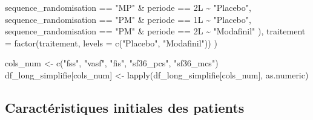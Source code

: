 \documentclass[
  letterpaper,
  DIV=11,
  numbers=noendperiod]{scrartcl}
\newenvironment{Shaded}{\begin{snugshade}}{\end{snugshade}}
\newcommand{\AttributeTok}[1]{\textcolor[rgb]{0.40,0.45,0.13}{#1}}
\newcommand{\DecValTok}[1]{\textcolor[rgb]{0.68,0.00,0.00}{#1}}
\newcommand{\FunctionTok}[1]{\textcolor[rgb]{0.28,0.35,0.67}{#1}}
\newcommand{\NormalTok}[1]{\textcolor[rgb]{0.00,0.23,0.31}{#1}}
\newcommand{\OtherTok}[1]{\textcolor[rgb]{0.00,0.23,0.31}{#1}}
\newcommand{\SpecialCharTok}[1]{\textcolor[rgb]{0.37,0.37,0.37}{#1}}
\newcommand{\StringTok}[1]{\textcolor[rgb]{0.13,0.47,0.30}{#1}}
\begin{document}
\begin{Shaded}
\begin{Highlighting}[]
\NormalTok{            sequence\_randomisation }\SpecialCharTok{==} \StringTok{"MP"} \SpecialCharTok{\&}\NormalTok{ periode }\SpecialCharTok{==} \DecValTok{2}\NormalTok{L }\SpecialCharTok{\textasciitilde{}} \StringTok{"Placebo"}\NormalTok{,}
\NormalTok{            sequence\_randomisation }\SpecialCharTok{==} \StringTok{"PM"} \SpecialCharTok{\&}\NormalTok{ periode }\SpecialCharTok{==} \DecValTok{1}\NormalTok{L }\SpecialCharTok{\textasciitilde{}} \StringTok{"Placebo"}\NormalTok{,}
\NormalTok{            sequence\_randomisation }\SpecialCharTok{==} \StringTok{"PM"} \SpecialCharTok{\&}\NormalTok{ periode }\SpecialCharTok{==} \DecValTok{2}\NormalTok{L }\SpecialCharTok{\textasciitilde{}} \StringTok{"Modafinil"}
\NormalTok{        ),}
        \AttributeTok{traitement =} \FunctionTok{factor}\NormalTok{(traitement, }\AttributeTok{levels =} \FunctionTok{c}\NormalTok{(}\StringTok{"Placebo"}\NormalTok{, }\StringTok{"Modafinil"}\NormalTok{))}
\NormalTok{    )}

\NormalTok{cols\_num }\OtherTok{\textless{}{-}} \FunctionTok{c}\NormalTok{(}\StringTok{"fss"}\NormalTok{, }\StringTok{"vasf"}\NormalTok{, }\StringTok{"fis"}\NormalTok{, }\StringTok{"sf36\_pcs"}\NormalTok{, }\StringTok{"sf36\_mcs"}\NormalTok{)}
\NormalTok{df\_long\_simplifie[cols\_num] }\OtherTok{\textless{}{-}} \FunctionTok{lapply}\NormalTok{(df\_long\_simplifie[cols\_num], as.numeric)}
\end{Highlighting}
\end{Shaded}

\subsection{Caractéristiques initiales des
patients}\label{caractuxe9ristiques-initiales-des-patients}
\end{document}
